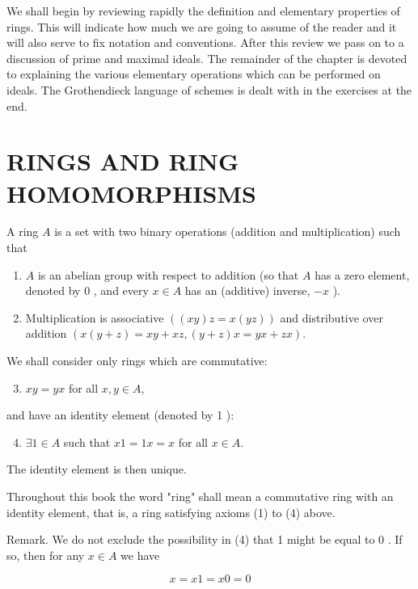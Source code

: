 \documentclass{standalone}
\theoremstyle{definition}
\theoremstyle{remark}
\begin{document}
We shall begin by reviewing rapidly the definition and elementary properties of rings. This will indicate how much we are going to assume of the reader and it will also serve to fix notation and conventions. After this review we pass on to a discussion of prime and maximal ideals. The remainder of the chapter is devoted to explaining the various elementary operations which can be performed on ideals. The Grothendieck language of schemes is dealt with in the exercises at the end.

\section{RINGS AND RING HOMOMORPHISMS}
A ring $A$ is a set with two binary operations (addition and multiplication) such that

\begin{enumerate}
  \item $A$ is an abelian group with respect to addition (so that $A$ has a zero element, denoted by 0 , and every $x \in A$ has an (additive) inverse, $-x$ ).

  \item Multiplication is associative $((x y) z=x(y z))$ and distributive over addition $(x(y+z)=x y+x z,(y+z) x=y x+z x)$.

\end{enumerate}

We shall consider only rings which are commutative:

\begin{enumerate}
  \setcounter{enumi}{2}
  \item $x y=y x$ for all $x, y \in A$,
\end{enumerate}

and have an identity element (denoted by 1 ):

\begin{enumerate}
  \setcounter{enumi}{3}
  \item $\exists 1 \in A$ such that $x 1=1 x=x$ for all $x \in A$.
\end{enumerate}

The identity element is then unique.

Throughout this book the word "ring" shall mean a commutative ring with an identity element, that is, a ring satisfying axioms (1) to (4) above.

Remark. We do not exclude the possibility in (4) that 1 might be equal to 0 . If so, then for any $x \in A$ we have

\[
x=x 1=x 0=0
\]
\end{document}
